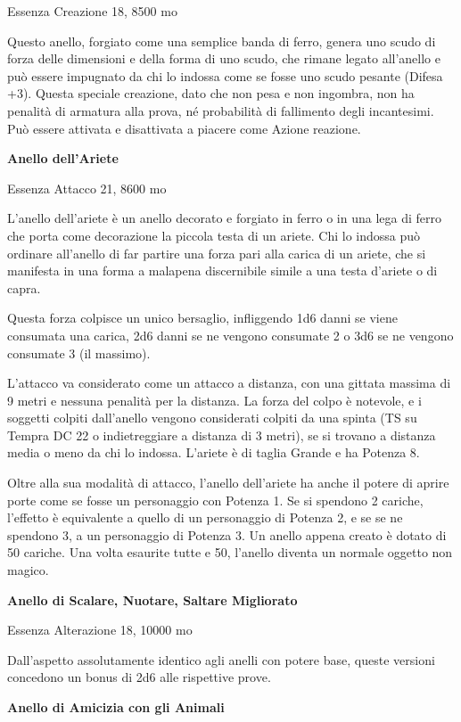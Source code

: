 \documentclass[a4paper,11pt,twoside,openany]{book}
\begin{document}
{Essenza Creazione 18, 8500 mo

Questo anello, forgiato come una semplice banda di ferro, genera uno scudo di forza delle dimensioni e della forma di uno scudo, che rimane legato all'anello e può essere impugnato da chi lo indossa come se fosse uno scudo pesante (Difesa +3). Questa speciale creazione, dato che non pesa e non ingombra, non ha penalità di armatura alla prova, né probabilità di fallimento degli incantesimi. Può essere attivata e disattivata a piacere come Azione reazione.

\textbf{Anello dell'Ariete}

Essenza Attacco 21, 8600 mo

L'anello dell'ariete è un anello decorato e forgiato in ferro o in una lega di ferro che porta come decorazione la piccola testa di un ariete. Chi lo indossa può ordinare all'anello di far partire una forza pari alla carica di un ariete, che si manifesta in una forma a malapena discernibile simile a una testa d'ariete o di capra.

Questa forza colpisce un unico bersaglio, infliggendo 1d6 danni se viene consumata una carica, 2d6 danni se ne vengono consumate 2 o 3d6 se ne vengono consumate 3 (il massimo).

L'attacco va considerato come un attacco a distanza, con una gittata massima di 9 metri e nessuna penalità per la distanza. La forza del colpo è notevole, e i soggetti colpiti dall'anello vengono considerati colpiti da una spinta (TS su Tempra DC 22 o indietreggiare a distanza di 3 metri), se si trovano a distanza media o meno da chi lo indossa. L'ariete è di taglia Grande e ha Potenza 8.

Oltre alla sua modalità di attacco, l'anello dell'ariete ha anche il potere di aprire porte come se fosse un personaggio con Potenza 1. Se si spendono 2 cariche, l'effetto è equivalente a quello di un personaggio di Potenza 2, e se se ne spendono 3, a un personaggio di Potenza 3. Un anello appena creato è dotato di 50 cariche. Una volta esaurite tutte e 50, l'anello diventa un normale oggetto non magico.

\textbf{Anello di Scalare, Nuotare, Saltare Migliorato}

Essenza Alterazione 18, 10000 mo

Dall'aspetto assolutamente identico agli anelli con potere base, queste
versioni concedono un bonus di 2d6 alle rispettive prove.

\textbf{Anello di Amicizia con gli Animali}

}
\end{document}
